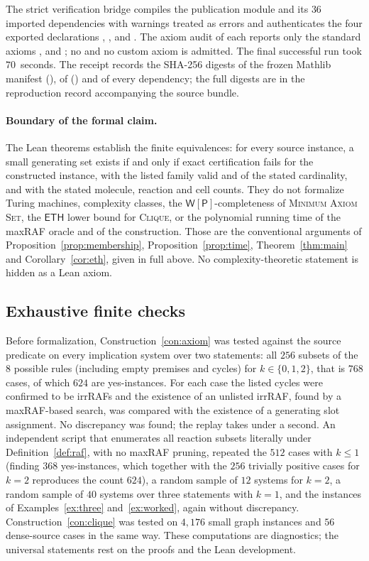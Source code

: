 \documentclass[11pt,a4paper]{article}
\theoremstyle{plain}
\theoremstyle{definition}
\theoremstyle{remark}
\newcommand{\MAS}{\textup{\textsc{Minimum Axiom Set}}}
\newcommand{\Clique}{\textup{\textsc{Clique}}}
\newcommand{\WP}{\mathsf{W[P]}}
\newcommand{\ETH}{\mathsf{ETH}}
\begin{document}
The strict verification bridge compiles the publication module and its $36$ imported dependencies with warnings treated as errors and authenticates the four exported declarations , ,  and . The axiom audit of each reports only the standard axioms ,  and ; no  and no custom axiom is admitted. The final successful run took $70$~seconds. The receipt records the SHA-256 digests of the frozen Mathlib manifest (), of  () and of every dependency; the full digests are in the reproduction record accompanying the source bundle.

\paragraph{Boundary of the formal claim.} The Lean theorems establish the finite equivalences: for every source instance, a small generating set exists if and only if exact certification fails for the constructed instance, with the listed family valid and of the stated cardinality, and with the stated molecule, reaction and cell counts. They do not formalize Turing machines, complexity classes, the $\WP$-completeness of \MAS, the $\ETH$ lower bound for \Clique, or the polynomial running time of the maxRAF oracle and of the construction. Those are the conventional arguments of Proposition~\ref{prop:membership}, Proposition~\ref{prop:time}, Theorem~\ref{thm:main} and Corollary~\ref{cor:eth}, given in full above. No complexity-theoretic statement is hidden as a Lean axiom.

\subsection{Exhaustive finite checks}

Before formalization, Construction~\ref{con:axiom} was tested against the source predicate on every implication system over two statements: all $256$ subsets of the $8$ possible rules (including empty premises and cycles) for $k\in\{0,1,2\}$, that is $768$ cases, of which $624$ are yes-instances. For each case the listed cycles were confirmed to be irrRAFs and the existence of an unlisted irrRAF, found by a maxRAF-based search, was compared with the existence of a generating slot assignment. No discrepancy was found; the replay takes under a second. An independent script that enumerates all reaction subsets literally under Definition~\ref{def:raf}, with no maxRAF pruning, repeated the $512$ cases with $k\le1$ (finding $368$ yes-instances, which together with the $256$ trivially positive cases for $k=2$ reproduces the count $624$), a random sample of $12$ systems for $k=2$, a random sample of $40$ systems over three statements with $k=1$, and the instances of Examples~\ref{ex:three} and~\ref{ex:worked}, again without discrepancy. Construction~\ref{con:clique} was tested on $4{,}176$ small graph instances and $56$ dense-source cases in the same way. These computations are diagnostics; the universal statements rest on the proofs and the Lean development.
\end{document}
